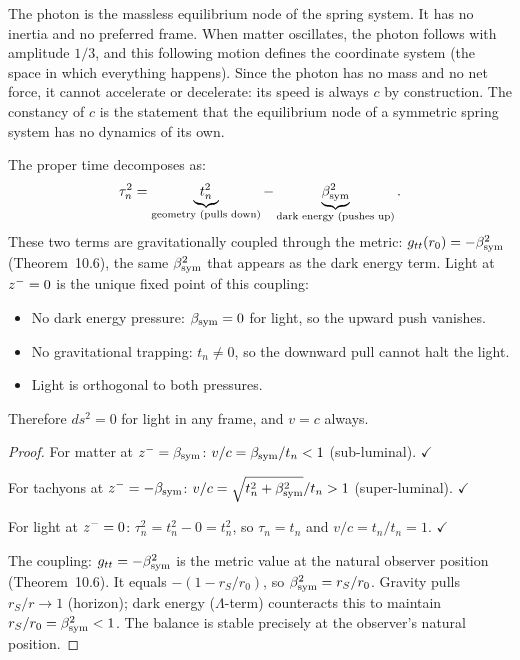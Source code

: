 \begin{remark}
The photon is the massless equilibrium node of the spring system.
It has no inertia and no preferred frame.
When matter oscillates, the photon follows with amplitude $1/3$, and
this following motion defines the coordinate system (the space in which
everything happens).
Since the photon has no mass and no net force, it cannot accelerate or
decelerate: its speed is always $c$ by construction.
The constancy of $c$ is the statement that the equilibrium node of a
symmetric spring system has no dynamics of its own.
\end{remark}

\begin{theorem}
\label{thm:light-equil}
The proper time decomposes as:
\[
  \tau_n^2
  = \underbrace{t_n^2}_{\text{geometry (pulls down)}}
  - \underbrace{\beta_{\mathrm{sym}}^2}_{\text{dark energy (pushes up)}}.
\]
These two terms are gravitationally coupled through the metric:
$g_{tt}(r_0)=-\beta_{\mathrm{sym}}^2$ (Theorem~10.6), the same $\beta_{\mathrm{sym}}^2$
that appears as the dark energy term.
Light at $z^-=0$ is the unique fixed point of this coupling:
\begin{itemize}
  \item No dark energy pressure: $\beta_{\mathrm{sym}}=0$ for light, so the upward
        push vanishes.
  \item No gravitational trapping: $t_n\neq 0$, so the downward pull
        cannot halt the light.
  \item Light is orthogonal to both pressures.
\end{itemize}
Therefore $ds^2=0$ for light in any frame, and $v=c$ always.
\begin{proof}
For matter at $z^-=\beta_{\mathrm{sym}}$: $v/c=\beta_{\mathrm{sym}}/t_n<1$ (sub-luminal). $\checkmark$

For tachyons at $z^-=-\beta_{\mathrm{sym}}$:
$v/c=\sqrt{t_n^2+\beta_{\mathrm{sym}}^2}/t_n>1$ (super-luminal). $\checkmark$

For light at $z^-=0$:
$\tau_n^2=t_n^2-0=t_n^2$, so $\tau_n=t_n$ and $v/c=t_n/t_n=1$.
$\checkmark$

The coupling: $g_{tt}=-\beta_{\mathrm{sym}}^2$ is the metric value at the natural
observer position (Theorem~10.6).
It equals $-(1-r_S/r_0)$, so $\beta_{\mathrm{sym}}^2=r_S/r_0$.
Gravity pulls $r_S/r\to 1$ (horizon); dark energy ($\Lambda$-term)
counteracts this to maintain $r_S/r_0=\beta_{\mathrm{sym}}^2<1$.
The balance is stable precisely at the observer's natural position.
\end{proof}
\end{theorem}


